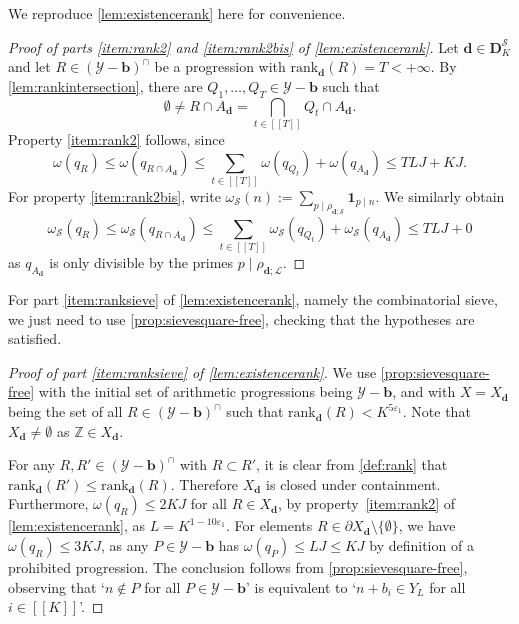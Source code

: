 \documentclass[11pt]{amsart}
\theoremstyle{definition}
\renewcommand{\leq}{\leqslant}
\newcommand{\sinterval}[1]{[\![#1]\!] }
\newcommand{\ind}[1]{\mathbf{1}_{#1}}
\newcommand{\eps}{\varepsilon}
\newcommand{\Z}{\mathbb{Z}}
\newcommand{\rank}{\mathrm{rank}_{\d}}
\renewcommand{\d}{\boldsymbol{d}}
\newcommand{\cstH}{\eps_1}
\newcommand{\rankcutoff}{\repK^{5\cstH}}
\newcommand{\boundelln}{\repK^{1-10\cstH}}
\newcommand{\sommespart}{b}
\newcommand{\fprod}[1]{\rho_{#1}}
\newcommand{\progression}{A_{\d}}
\newcommand{\lit}{\mathcal{L}}
\newcommand{\s}{\mathcal{S}}
\newcommand{\fancyD}{\mathbf{D}}
\newcommand{\Ds}{\fancyD^{\s}_{\!\repK}}
\newcommand{\elln}{L}
\newcommand{\Y}{Y_{\!\elln}}
\renewcommand{\vec}{\boldsymbol}
\newcommand{\prohibprog}{\mathcal{Y}}
\newcommand{\modulus}{q}
\newcommand{\Xd}{X_{\d}}
\newcommand{\repR}{J}
\newcommand{\repK}{K}
\newcommand{\newK}{\sinterval{K}}
\newcommand{\shiftedprog}{\prohibprog-\vec{\sommespart}}
\newcommand{\interprog}{(\shiftedprog)^{\cap}}
\newcommand{\ncond}{T}
\begin{document}
We reproduce \cref{lem:existencerank} here for convenience.

\existencerank*


\begin{proof}[Proof of parts \cref{item:rank2} and \cref{item:rank2bis} of \cref{lem:existencerank}]
Let $\d\in \Ds$ and let $R\in \interprog$ be a progression with ${\rank(R) = \ncond < +\infty}$. By \cref{lem:rankintersection}, there are ${Q_1, \ldots, Q_{\ncond}\in \shiftedprog}$ such that
\begin{equation*}
	\emptyset \neq R \cap \progression = \bigcap_{t\in\sinterval{\ncond}} Q_t \cap \progression.
\end{equation*}
Property \cref{item:rank2} follows, since
\begin{equation*}
	\omega(\modulus_{R}) \leq \omega(\modulus_{R\cap \progression}) \leq \sum_{t\in\sinterval{\ncond}} \omega(\modulus_{Q_t}) + \omega(\modulus_{\progression}) \leq \ncond \elln \repR + \repK \repR.
\end{equation*}
For property \cref{item:rank2bis}, write $\omega_{\s}(n) := \sum_{p\mid \fprod{\d; \s}} \ind{p\mid n}$. We similarly obtain
\begin{equation*}
	\omega_{\s}(\modulus_{R}) \leq \omega_{\s}(\modulus_{R\cap \progression}) \leq \sum_{t\in\sinterval{\ncond}} \omega_{\s}(\modulus_{Q_t}) + \omega_{\s}(\modulus_{\progression}) \leq \ncond \elln \repR + 0
\end{equation*}
as $\modulus_{\progression}$ is only divisible by the primes $p\mid \fprod{\d; \lit}$. 
\end{proof}

For part \cref{item:ranksieve} of \cref{lem:existencerank}, namely the combinatorial sieve, we just need to use \cref{prop:sievesquare-free}, checking that the hypotheses are satisfied.
\begin{proof}[Proof of part \cref{item:ranksieve} of \cref{lem:existencerank}]
We use \cref{prop:sievesquare-free} with the initial set of arithmetic progressions being $\shiftedprog$, and with $X = \Xd$ being the set of all $R\in \interprog$ such that $\rank(R) <  \rankcutoff$. Note that $\Xd\neq \emptyset$ as $\Z\in \Xd$.

For any $R,R'\in \interprog$ with $R\subset R'$, it is clear from \cref{def:rank} that $\rank(R') \leq \rank(R)$. Therefore $\Xd$ is closed under containment. Furthermore, $\omega(\modulus_{R}) \leq 2\repK \repR$ for all $R\in \Xd$, by property~\cref{item:rank2} of \cref{lem:existencerank}, as $\elln = \boundelln$. For elements $R\in \partial \Xd\setminus \{\emptyset\}$, we have $\omega(\modulus_{R}) \leq 3\repK \repR$, as any $P\in \shiftedprog$ has ${\omega(\modulus_{P}) \leq \elln \repR \leq \repK\repR}$ by definition of a prohibited progression. The conclusion follows from \cref{prop:sievesquare-free}, observing that `$n\not \in P$ for all $P\in \shiftedprog$' is equivalent to `$n+\sommespart_i \in \Y$ for all $i\in \newK$'.
\end{proof}
\end{document}
